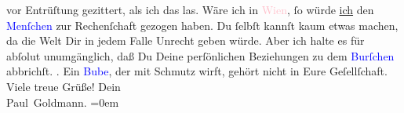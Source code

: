                vor Entrüſtung gezittert, als ich das las. Wäre ich in \textcolor{pink}{Wien}{}\ledrightnote{\textcolor{pink}{Wien}}, ſo würde \uline{ich} den \textcolor{blue}{Menſchen}{} zur Rechenſchaft gezogen haben. Du
               ſelbſt kannſt kaum etwas machen, da die Welt Dir in jedem Falle Unrecht geben würde.
               Aber ich halte es für abſolut unumgänglich, daß Du Deine perſönlichen Beziehungen zu
               dem \textcolor{blue}{Burſchen}{} abbrichſt.
                  \label{K_L02752-44v}\label{K_L02752-44h}.
               Ein \textcolor{blue}{Bube}{}, der mit Schmutz
               wirft, gehört nicht in Eure Geſellſchaft.\pend
           \pstart
           Viele treue Grüße! Dein {\\[\baselineskip]}\spacefill\mbox{Paul Goldmann.}\pend
           \leftskip=0em{}\endnumbering{}  
      